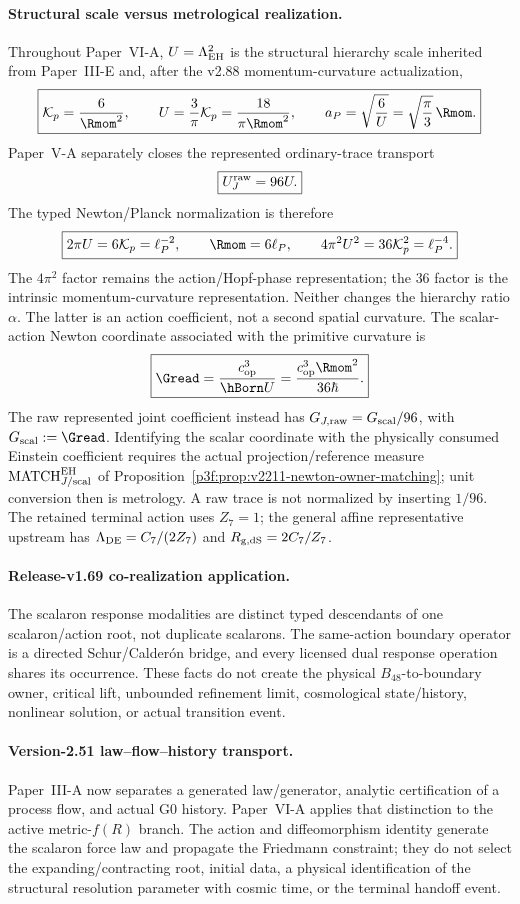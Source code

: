 \documentclass[12pt,a4paper]{article}
\begin{document}
\paragraph{Structural scale versus metrological realization.}
Throughout Paper~VI-A, \(U=\Lambda_{\rm EH}^2\) is the structural hierarchy scale inherited from Paper~III-E and, after the v2.88 momentum-curvature actualization,
\[
 \boxed{\mathcal K_p=\frac6{\Rmom^2},\qquad U=\frac3\pi\mathcal K_p=\frac{18}{\pi\Rmom^2},\qquad a_P=\sqrt{\frac6U}=\sqrt{\frac\pi3}\,\Rmom.}
\]
Paper~V-A separately closes the represented ordinary-trace transport
\[
 \boxed{U_J^{\rm raw}=96U.}
\]
The typed Newton/Planck normalization is therefore
\[
 \boxed{2\pi U=6\mathcal K_p=\ell_P^{-2},\qquad
 \Rmom=6\ell_P,\qquad
 4\pi^2U^2=36\mathcal K_p^2=\ell_P^{-4}.}
\]
The \(4\pi^2\) factor remains the action/Hopf-phase representation; the
\(36\) factor is the intrinsic momentum-curvature representation.  Neither
changes the hierarchy ratio \(\alpha\).
The latter is an action coefficient, not a second spatial curvature. The
scalar-action Newton coordinate associated with the primitive curvature is
\[
 \boxed{\Gread=\frac{c_{\rm op}^3}{\hBorn U}
 =\frac{c_{\rm op}^3\Rmom^2}{36\hbar}.}
\]
The raw represented joint coefficient instead has
$G_{J,\mathrm{raw}}=G_{\rm scal}/96$, with $G_{\rm scal}:=\Gread$.
Identifying the scalar coordinate with the physically consumed Einstein
coefficient requires the actual projection/reference measure
$\mathrm{MATCH}_{J/\mathrm{scal}}^{\rm EH}$ of
Proposition~\ref{p3f:prop:v2211-newton-owner-matching}; unit conversion then is
metrology. A raw trace is not normalized by inserting $1/96$.  The retained terminal action uses \(Z_7=1\); the general affine representative upstream has \(\Lambda_{\rm DE}=C_7/(2Z_7)\) and \(R_{\rm g,dS}=2C_7/Z_7\).

\paragraph{Release-v1.69 co-realization application.}
The scalaron response modalities are distinct typed descendants of one
scalaron/action root, not duplicate scalarons.  The same-action boundary
operator is a directed Schur/Calderón bridge, and every licensed dual response
operation shares its occurrence.  These facts do not create the physical
\(B_{48}\)-to-boundary owner, critical lift, unbounded refinement limit,
cosmological state/history, nonlinear solution, or actual transition event.

\paragraph{Version-2.51 law--flow--history transport.}
Paper~III-A now separates a generated law/generator, analytic certification of
a process flow, and actual G0 history.  Paper~VI-A applies that distinction to
the active metric-\(f(R)\) branch.  The action and diffeomorphism identity
generate the scalaron force law and propagate the Friedmann constraint; they do
not select the expanding/contracting root, initial data, a physical
identification of the structural resolution parameter with cosmic time, or the
terminal handoff event.
\end{document}
